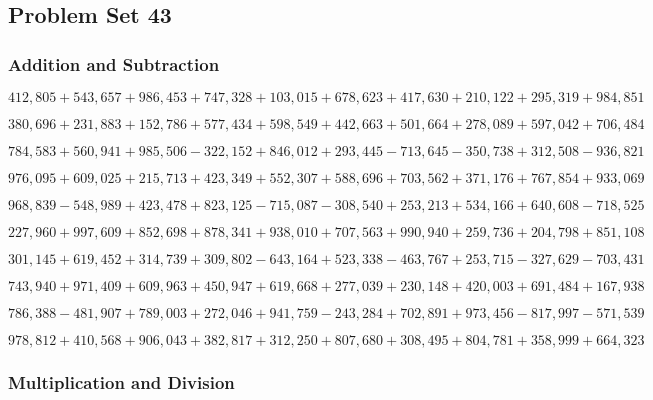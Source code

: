 \hypertarget{problem-set-43-4}{%
\subsection{Problem Set 43}\label{problem-set-43-4}}

\hypertarget{addition-and-subtraction-348}{%
\subsubsection{Addition and
Subtraction}\label{addition-and-subtraction-348}}

\(412,805+543,657+986,453+747,328+103,015+678,623+417,630+210,122+295,319+ 984,851\)

\(380,696+231,883+152,786+577,434+598,549+442,663+501,664+278,089+597,042+706,484\)

\(784,583+560,941+985,506-322,152+846,012+293,445-713,645-350,738+312,508-936,821\)

\(976,095+609,025+215,713+423,349+552,307+588,696+703,562+371,176+767,854+933,069\)

\(968,839-548,989+423,478+823,125-715,087-308,540+253,213+534,166+640,608-718,525\)

\(227,960+997,609+852,698+878,341+938,010+707,563+990,940+259,736+204,798+851,108\)

\(301,145+619,452+314,739+309,802-643,164+523,338-463,767+253,715-327,629-703,431\)

\(743,940+971,409+609,963+450,947+619,668+277,039+230,148+420,003+691,484+167,938\)

\(786,388-481,907+789,003+272,046+941,759-243,284+702,891+973,456-817,997-571,539\)

\(978,812+410,568+906,043+382,817+312,250+807,680+308,495+804,781+358,999+664,323\)

\hypertarget{multiplication-and-division-347}{%
\subsubsection{Multiplication and
Division}\label{multiplication-and-division-347}}

